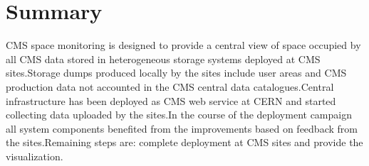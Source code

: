 \section {Summary}

CMS space monitoring is designed to provide a central view of space occupied by all CMS data stored in heterogeneous storage systems deployed at CMS sites.Storage dumps produced locally by the sites include user areas and CMS production data not accounted in the CMS central data catalogues.Central infrastructure has been deployed as CMS web service at CERN and started collecting data uploaded by the sites.In the course of the deployment campaign all system components benefited from the improvements based on feedback from the sites.Remaining steps are: complete deployment at CMS sites and provide the visualization.
